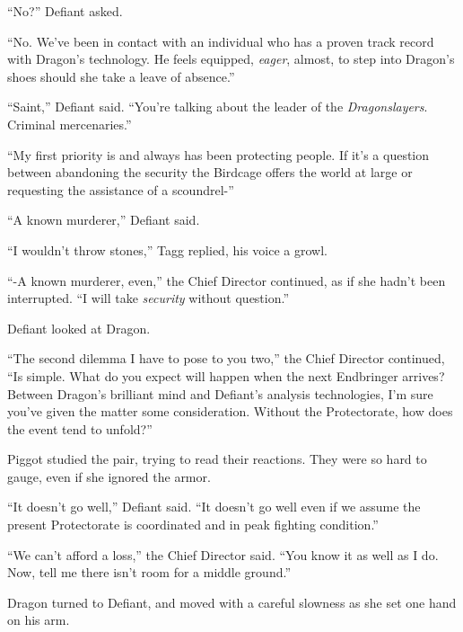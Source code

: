``No?'' Defiant asked.



``No.  We've been in contact with an individual who has a proven track record with Dragon's technology.  He feels equipped, \emph{eager}, almost, to step into Dragon's shoes should she take a leave of absence.''



``Saint,'' Defiant said.  ``You're talking about the leader of the \emph{Dragonslayers}.  Criminal mercenaries.''



``My first priority is and always has been protecting people.  If it's a question between abandoning the security the Birdcage offers the world at large or requesting the assistance of a scoundrel-''



``A known murderer,'' Defiant said.



``I wouldn't throw stones,'' Tagg replied, his voice a growl.



``-A known murderer, even,'' the Chief Director continued, as if she hadn't been interrupted.  ``I will take \emph{security} without question.''



Defiant looked at Dragon.



``The second dilemma I have to pose to you two,'' the Chief Director continued, ``Is simple.  What do you expect will happen when the next Endbringer arrives?  Between Dragon's brilliant mind and Defiant's analysis technologies, I'm sure you've given the matter some consideration.  Without the Protectorate, how does the event tend to unfold?''



Piggot studied the pair, trying to read their reactions.  They were so hard to gauge, even if she ignored the armor.



``It doesn't go well,'' Defiant said.  ``It doesn't go well even if we assume the present Protectorate is coordinated and in peak fighting condition.''



``We can't afford a loss,'' the Chief Director said.  ``You know it as well as I do.  Now, tell me there isn't room for a middle ground.''



Dragon turned to Defiant, and moved with a careful slowness as she set one hand on his arm.



